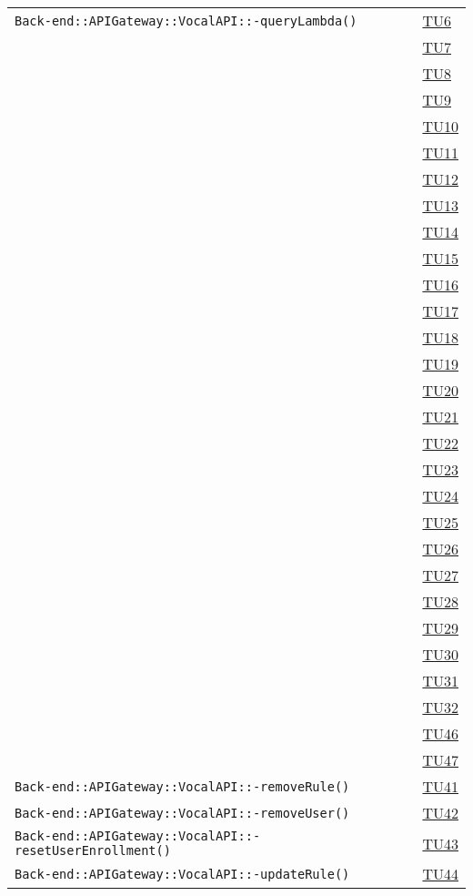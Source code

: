 \begin{longtable}{|>{\centering}m{12cm}|m{1cm}<{\centering}|}
\texttt{Back-end::APIGateway::VocalAPI::-\linebreak queryLambda()} & \hyperlink{TU6}{TU6}\\ & \hyperlink{TU7}{TU7}\\ & \hyperlink{TU8}{TU8}\\ & \hyperlink{TU9}{TU9}\\ & \hyperlink{TU10}{TU10}\\ & \hyperlink{TU11}{TU11}\\ & \hyperlink{TU12}{TU12}\\ & \hyperlink{TU13}{TU13}\\ & \hyperlink{TU14}{TU14}\\ & \hyperlink{TU15}{TU15}\\ & \hyperlink{TU16}{TU16}\\ & \hyperlink{TU17}{TU17}\\ & \hyperlink{TU18}{TU18}\\ & \hyperlink{TU19}{TU19}\\ & \hyperlink{TU20}{TU20}\\ & \hyperlink{TU21}{TU21}\\ & \hyperlink{TU22}{TU22}\\ & \hyperlink{TU23}{TU23}\\ & \hyperlink{TU24}{TU24}\\ & \hyperlink{TU25}{TU25}\\ & \hyperlink{TU26}{TU26}\\ & \hyperlink{TU27}{TU27}\\ & \hyperlink{TU28}{TU28}\\ & \hyperlink{TU29}{TU29}\\ & \hyperlink{TU30}{TU30}\\ & \hyperlink{TU31}{TU31}\\ & \hyperlink{TU32}{TU32}\\ & \hyperlink{TU46}{TU46}\\ & \hyperlink{TU47}{TU47}\\ \hline
\texttt{Back-end::APIGateway::VocalAPI::-\linebreak removeRule()} & \hyperlink{TU41}{TU41}\\ \hline
\texttt{Back-end::APIGateway::VocalAPI::-\linebreak removeUser()} & \hyperlink{TU42}{TU42}\\ \hline
\texttt{Back-end::APIGateway::VocalAPI::-\linebreak resetUserEnrollment()} & \hyperlink{TU43}{TU43}\\ \hline
\texttt{Back-end::APIGateway::VocalAPI::-\linebreak updateRule()} & \hyperlink{TU44}{TU44}\\ \hline

\end{longtable}
